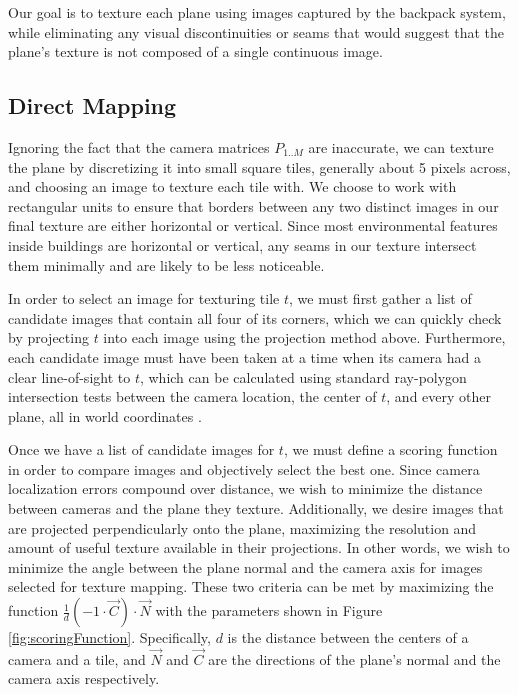 \documentclass[10pt,twocolumn,letterpaper]{article}
\begin{document}
Our goal is to texture each plane using images captured by the
backpack system, while eliminating any visual discontinuities or seams
that would suggest that the plane's texture is not composed of a
single continuous image.

\subsection{Direct Mapping}
\label{sec:directMapping}

Ignoring the fact that the camera matrices $P_{1..M}$ are inaccurate,
we can texture the plane by discretizing it into small square tiles,
generally about 5 pixels across, and choosing an image to texture each
tile with. We choose to work with rectangular units to ensure that
borders between any two distinct images in our final texture are
either horizontal or vertical. Since most environmental features
inside buildings are horizontal or vertical, any seams in our texture
intersect them minimally and are likely to be less noticeable.

In order to select an image for texturing tile $t$, we must first
gather a list of candidate images that contain all four of its
corners, which we can quickly check by projecting $t$ into each image
using the projection method above. Furthermore, each candidate image
must have been taken at a time when its camera had a clear
line-of-sight to $t$, which can be calculated using standard
ray-polygon intersection tests between the camera location, the center
of $t$, and every other plane, all in world coordinates
\cite{rayintersection}.

Once we have a list of candidate images for $t$, we must define a
scoring function in order to compare images and objectively select the
best one. Since camera localization errors compound over distance, we
wish to minimize the distance between cameras and the plane they
texture. Additionally, we desire images that are projected
perpendicularly onto the plane, maximizing the resolution and amount
of useful texture available in their projections. In other words, we
wish to minimize the angle between the plane normal and the camera
axis for images selected for texture mapping. These two criteria can
be met by maximizing the function $\frac{1}{d} (-1 \cdot \vec{C})
\cdot \vec{N}$ with the parameters shown in Figure
\ref{fig:scoringFunction}. Specifically, $d$ is the distance between
the centers of a camera and a tile, and $\vec{N}$ and $\vec{C}$ are
the directions of the plane's normal and the camera axis respectively.
\end{document}
